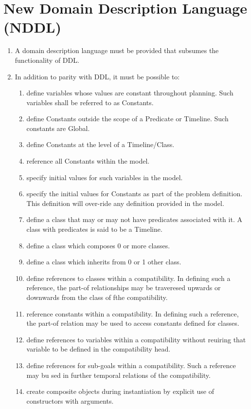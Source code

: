 \documentclass[twoside, 11pt]{article}
\begin{document}
\section{New Domain Description Language (NDDL)}
\begin{enumerate}
\item A domain description language must be provided that subsumes the functionality of DDL.
\item In addition to parity with DDL, it must be possible to:
\begin{enumerate}
\item define variables whose values are constant throughout planning. Such variables shall be referred to as Constants.
\item define Constants outside the scope of a Predicate or Timeline. Such constants are Global.
\item define Constants at the level of a Timeline/Class.
\item reference all Constants within the model.
\item specify initial values for such variables in the model.
\item specify the initial values for Constants as part of the problem definition. This definition will over-ride any definition provided in the model.
\item define a class that may or may not have predicates associated with it. A class with predicates is said to be a Timeline.
\item define a class which composes 0 or more classes.
\item define a class which inherits from 0 or 1 other class.
\item define references to classes within a compatibility. In defining such a reference, the part-of relationships may be traveresed upwards or downwards from the class of fthe compatibility.
\item reference constants within a compatibility. In defining such a reference, the part-of relation may be used to access constants defined for classes.
\item define references to variables within a compatibility without reuiring that variable to be defined in the compatibility head.
\item define references for sub-goals within a compatibility. Such a reference may bu sed in further temporal relations of the compatibility. 
\item create composite objects during instantiation by explicit use of constructors with arguments.

\end{enumerate}
\end{enumerate}
\end{document}
